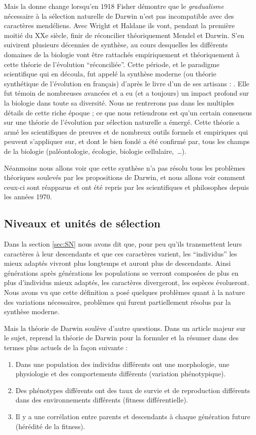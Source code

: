 \documentclass[a4paper,10pt]{article}
\begin{document}
Mais la donne change lorsqu'en 1918 Fisher démontre que le \emph{gradualisme} nécessaire à la sélection naturelle de Darwin n'est pas incompatible avec des caractères mendéliens. Avec Wright et Haldane ils vont, pendant la première moitié du XXe siècle, finir de réconcilier théoriquement Mendel et Darwin. S'en suivirent plusieurs décennies de synthèse, au cours desquelles les différents domaines de la biologie vont être rattachés empiriquement et théoriquement à cette théorie de l'évolution ``réconciliée''. Cette période, et le paradigme scientifique qui en découla, fut appelé la synthèse moderne (ou théorie synthétique de l'évolution en français) d'après le livre d'un de ses artisans : \cite{huxley1942evolution}. Elle fut témoin de nombreuses avancées et a eu (et a toujours) un impact profond sur la biologie dans toute sa diversité. Nous ne rentrerons pas dans les multiples détails de cette riche époque ; ce que nous retiendrons est qu'un certain consensus sur une théorie de l'évolution par sélection naturelle a émergé. Cette théorie a armé les scientifiques de preuves et de nombreux outils formels et empiriques qui peuvent s'appliquer sur, et dont le bien fondé a été confirmé par, tous les champs de la biologie (paléontologie, écologie, biologie cellulaire,~\ldots). 

Néanmoins nous allons voir que cette synthèse n'a pas résolu tous les problèmes théoriques soulevés par les propositions de Darwin, et nous allons voir comment ceux-ci sont réapparus et ont été repris par les scientifiques et philosophes depuis les années 1970.

\subsection{Niveaux et unités de sélection}\label{sec:lvl}
Dans la section \ref{sec:SN} nous avons dit que, pour peu qu'ils transmettent leurs caractères à leur descendants et que ces caractères varient, les ``individus'' les mieux adaptés vivront plus longtemps et auront plus de descendants. Ainsi générations après générations les populations se verront composées de plus en plus d'individus mieux adaptés, les caractères divergeront, les espèces évolueront. Nous avons vu que cette définition a posé quelques problèmes quant à la nature des variations nécessaires, problèmes qui furent partiellement résolus par la synthèse moderne.

Mais la théorie de Darwin soulève d'autre questions. Dans un article majeur sur le sujet, \cite{lewontin70unitsselection} reprend la théorie de Darwin pour la formuler et la résumer dans des termes plus actuels de la façon suivante :
\begin{enumerate}
	\item Dans une population des individus différents ont une morphologie, une physiologie et des comportements différents (variation phénotypique).
	\item Des phénotypes différents ont des taux de survie et de reproduction différents dans des environnements différents (fitness différentielle).
	\item Il y a une corrélation entre parents et descendants à chaque génération future (hérédité de la fitness).
\end{enumerate}
\end{document}
